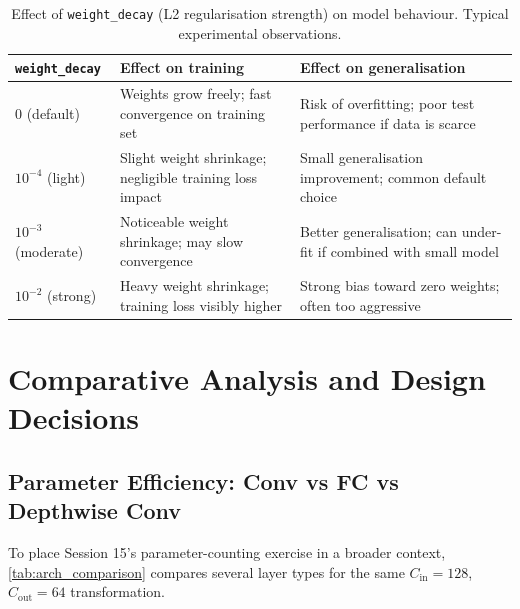\documentclass[12pt,a4paper]{article}
\newcommand{\Cin}{C_{\mathrm{in}}}
\newcommand{\Cout}{C_{\mathrm{out}}}
\begin{document}
\begin{table}[ht]
  \centering
  \caption{Effect of \texttt{weight\_decay} (L2 regularisation strength) on
    model behaviour. Typical experimental observations.}
  \label{tab:l2_effect}
  \begin{tabularx}{\linewidth}{@{}lXX@{}}
    \toprule
    \texttt{weight\_decay} & Effect on training & Effect on generalisation \\
    \midrule
    $0$ (default)
      & Weights grow freely; fast convergence on training set
      & Risk of overfitting; poor test performance if data is scarce \\
    $10^{-4}$ (light)
      & Slight weight shrinkage; negligible training loss impact
      & Small generalisation improvement; common default choice \\
    $10^{-3}$ (moderate)
      & Noticeable weight shrinkage; may slow convergence
      & Better generalisation; can under-fit if combined with small model \\
    $10^{-2}$ (strong)
      & Heavy weight shrinkage; training loss visibly higher
      & Strong bias toward zero weights; often too aggressive \\
    \bottomrule
  \end{tabularx}
\end{table}

\section{Comparative Analysis and Design Decisions}
\label{sec:comparison}

\subsection{Parameter Efficiency: Conv vs FC vs Depthwise Conv}

To place Session 15's parameter-counting exercise in a broader context,
\cref{tab:arch_comparison} compares several layer types for the
same $\Cin = 128$, $\Cout = 64$ transformation.
\end{document}
